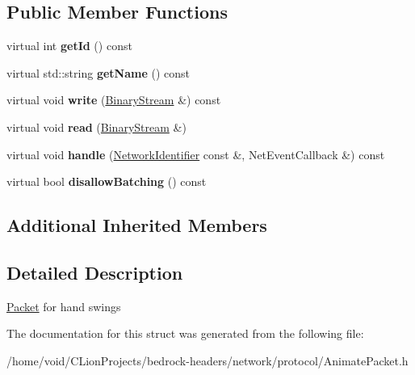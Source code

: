 \subsection*{Public Member Functions}
\begin{DoxyCompactItemize}
\item 
\mbox{\label{struct_animate_packet_a3b763dfe9281d3b9071a4da6bf4519be}} 
virtual int {\bfseries get\+Id} () const
\item 
\mbox{\label{struct_animate_packet_a077c6d7cdfcc9778ba1aa3a720318b46}} 
virtual std\+::string {\bfseries get\+Name} () const
\item 
\mbox{\label{struct_animate_packet_a00a122d83dc4d867ed88b6f222b8aea5}} 
virtual void {\bfseries write} (\mbox{\hyperlink{struct_binary_stream}{Binary\+Stream}} \&) const
\item 
\mbox{\label{struct_animate_packet_ac227b720402df725009d6643bfa8899d}} 
virtual void {\bfseries read} (\mbox{\hyperlink{struct_binary_stream}{Binary\+Stream}} \&)
\item 
\mbox{\label{struct_animate_packet_a9bdc1a3d501a83b641cf19400f66d24c}} 
virtual void {\bfseries handle} (\mbox{\hyperlink{struct_network_identifier}{Network\+Identifier}} const \&, Net\+Event\+Callback \&) const
\item 
\mbox{\label{struct_animate_packet_a575a5559423083d41d3fef010413b7dd}} 
virtual bool {\bfseries disallow\+Batching} () const
\end{DoxyCompactItemize}
\subsection*{Additional Inherited Members}


\subsection{Detailed Description}
\mbox{\hyperlink{struct_packet}{Packet}} for hand swings 

The documentation for this struct was generated from the following file\+:\begin{DoxyCompactItemize}
\item 
/home/void/\+C\+Lion\+Projects/bedrock-\/headers/network/protocol/Animate\+Packet.\+h\end{DoxyCompactItemize}
